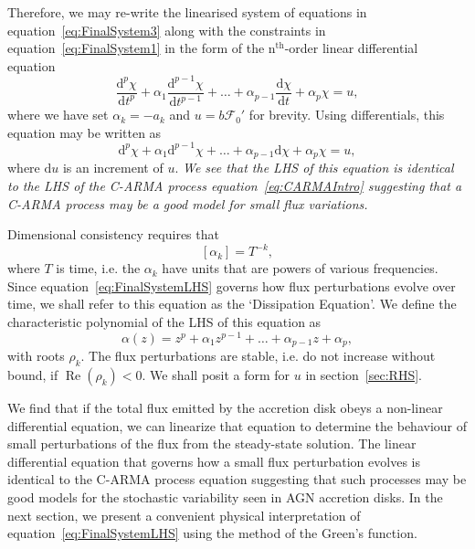 \documentclass[a4paper,fleqn,usenatbib]{mnras}
\begin{document}
Therefore, we may re-write the linearised system of equations in equation~\eqref{eq:FinalSystem3} along with the constraints in equation~\eqref{eq:FinalSystem1} in the form of the n$^{\mathrm{th}}$-order linear differential equation
\begin{equation}\label{eq:FinalSystemLHS}
\frac{\mathrm{d}^{p}\chi}{\mathrm{d}t^{p}} + \alpha_{1} \frac{\mathrm{d}^{p-1}\chi}{\mathrm{d}t^{p-1}} + \ldots + \alpha_{p-1} \frac{\mathrm{d}\chi}{\mathrm{d}t} + \alpha_{p} \chi = u,
\end{equation}
where we have set $\alpha_{k} = -a_{k}$ and $u = b\mathcal{F}_{0}'$ for brevity. Using differentials, this equation may be written as
\begin{equation}\label{eq:FinalSystemLHSDiff}
\mathrm{d}^{p}\chi + \alpha_{1} \mathrm{d}^{p-1}\chi + \ldots + \alpha_{p-1} \mathrm{d}\chi + \alpha_{p} \chi = u,
\end{equation}
where $\mathrm{d}u$ is an increment of $u$. \textit{We see that the LHS of this equation is identical to the LHS of the C-ARMA process equation~\eqref{eq:CARMAIntro} suggesting that a C-ARMA process may be a good model for small flux variations.}

Dimensional consistency requires that 
\begin{equation}\label{eq:ARUnits}
[\alpha_{k}] = T^{-k},
\end{equation}
where $T$ is time, i.e. the $\alpha_{k}$ have units that are powers of various frequencies. Since equation~\eqref{eq:FinalSystemLHS} governs how flux perturbations evolve over time, we shall refer to this equation as the `Dissipation Equation'. We define the characteristic polynomial of the LHS of this equation as
\begin{equation}\label{eq:ARCharPoly}
\alpha(z) = z^{p} + \alpha_{1} z^{p-1} + \ldots + \alpha_{p-1}z + \alpha_{p},
\end{equation}
with roots $\rho_{k}$. The flux perturbations are stable, i.e. do not increase without bound, if $\operatorname{Re}(\rho_{k}) < 0$. We shall posit a form for $u$ in section~\ref{sec:RHS}. 

We find that if the total flux emitted by the accretion disk obeys a non-linear differential equation, we can linearize that equation to determine the behaviour of small perturbations of the flux from the steady-state solution. The linear differential equation that governs how a small flux perturbation evolves is identical to the C-ARMA process equation suggesting that such processes may be good models for the stochastic variability seen in AGN accretion disks. In the next section, we present a convenient physical interpretation of equation~\eqref{eq:FinalSystemLHS} using the method of the Green's function.
\end{document}
